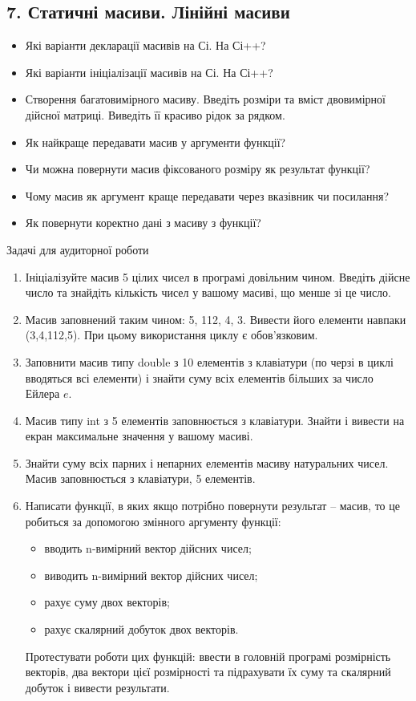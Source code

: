\documentclass[]{article}
\date{}
\begin{document}
\newpage
\subsection{ 7. Статичні масиви. Лінійні масиви }
\setcounter{subsection}{1}


\begin{itemize}
\item
  Які варіанти декларації масивів на Сі. На Сі++?
\item
  Які варіанти ініціалізації масивів на Сі. На Сі++?
\item
  Створення багатовимірного масиву. Введіть розміри та вміст двовимірної
  дійсної матриці. Виведіть її красиво рідок за рядком.
\item
  Як найкраще передавати масив у аргументи функції?
\item
  Чи можна повернути масив фіксованого розміру як результат функції?
\item
  Чому масив як аргумент краще передавати через вказівник чи посилання?
\item
  Як повернути коректно дані з масиву з функції?
\end{itemize}

Задачі для аудиторної роботи

\begin{enumerate}
\def\labelenumi{\arabic{enumi})}
\item
  Ініціалізуйте масив 5 цілих чисел в програмі довільним чином. Введіть
  дійсне число та знайдіть кількість чисел у вашому масиві, що менше зі
  це число.

\item
  Масив заповнений таким чином: 5, 112, 4, 3. Вивести його елементи
  навпаки (3,4,112,5). При цьому використання циклу є обов'язковим.
\item
  Заповнити масив типу double з 10 елементів з клавіатури (по черзі в
  циклі вводяться всі елементи) і знайти суму всіх елементів більших за
  число Ейлера \(e\).
\item
  Масив типу int з 5 елементів заповнюється з клавіатури. Знайти і
  вивести на екран максимальне значення у вашому масиві.
\item
  Знайти суму всіх парних і непарних елементів масиву натуральних чисел.
  Масив заповнюється з клавіатури, 5 елементів.
\item
Написати функції, в яких якщо потрібно повернути результат -- масив,
то це робиться за допомогою змінного аргументу функції:
\begin{itemize}
\item вводить n-вимірний вектор дійсних чисел;
\item виводить n-вимірний вектор дійсних чисел;
\item рахує суму двох векторів;
\item рахує скалярний добуток двох векторів.
 \end{itemize}
Протестувати роботи цих функцій: ввести в головній програмі розмірність
векторів, два вектори цієї розмірності та підрахувати їх суму та скалярний
добуток і вивести результати.
\end{enumerate}
\end{document}
